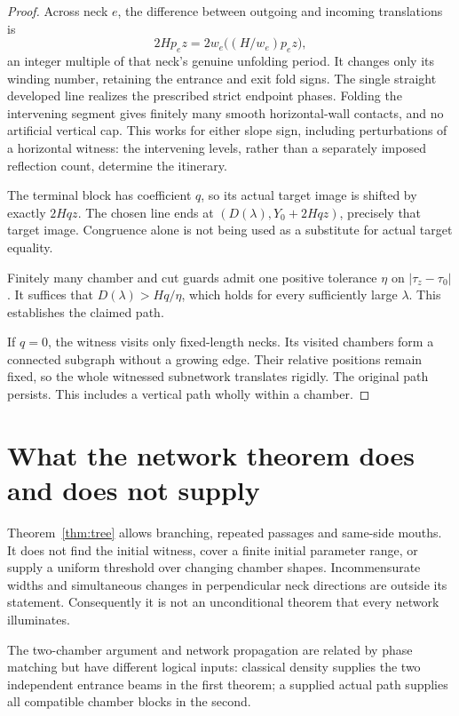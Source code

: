 \documentclass[11pt]{article}
\theoremstyle{definition}
\begin{document}
\begin{proof}
Across neck $e$, the difference between outgoing and incoming translations is
\[
 2Hp_ez=2w_e\bigl((H/w_e)p_ez\bigr),
\]
an integer multiple of that neck's genuine unfolding period. It changes only its winding number, retaining the entrance and exit fold signs. The single straight developed line realizes the prescribed strict endpoint phases. Folding the intervening segment gives finitely many smooth horizontal-wall contacts, and no artificial vertical cap. This works for either slope sign, including perturbations of a horizontal witness: the intervening levels, rather than a separately imposed reflection count, determine the itinerary.

The terminal block has coefficient $q$, so its actual target image is shifted by exactly $2Hqz$. The chosen line ends at $(D(\lambda),Y_0+2Hqz)$, precisely that target image. Congruence alone is not being used as a substitute for actual target equality.

Finitely many chamber and cut guards admit one positive tolerance $\eta$ on $|\tau_z-\tau_0|$. It suffices that $D(\lambda)>Hq/\eta$, which holds for every sufficiently large $\lambda$. This establishes the claimed path.

If $q=0$, the witness visits only fixed-length necks. Its visited chambers form a connected subgraph without a growing edge. Their relative positions remain fixed, so the whole witnessed subnetwork translates rigidly. The original path persists. This includes a vertical path wholly within a chamber.
\end{proof}

\section{What the network theorem does and does not supply}
Theorem~\ref{thm:tree} allows branching, repeated passages and same-side mouths. It does not find the initial witness, cover a finite initial parameter range, or supply a uniform threshold over changing chamber shapes. Incommensurate widths and simultaneous changes in perpendicular neck directions are outside its statement. Consequently it is not an unconditional theorem that every network illuminates.

The two-chamber argument and network propagation are related by phase matching but have different logical inputs: classical density supplies the two independent entrance beams in the first theorem; a supplied actual path supplies all compatible chamber blocks in the second.
\end{document}
